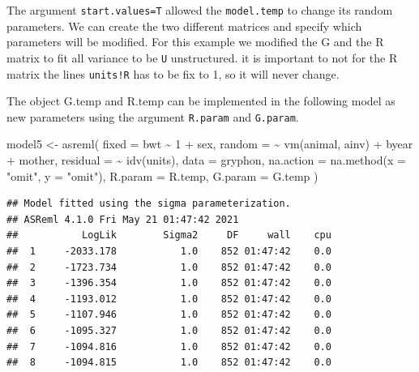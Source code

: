 \documentclass[
  12pt,
]{book}
\newenvironment{Shaded}{\begin{snugshade}}{\end{snugshade}}
\newcommand{\AttributeTok}[1]{\textcolor[rgb]{0.77,0.63,0.00}{#1}}
\newcommand{\DecValTok}[1]{\textcolor[rgb]{0.00,0.00,0.81}{#1}}
\newcommand{\FunctionTok}[1]{\textcolor[rgb]{0.00,0.00,0.00}{#1}}
\newcommand{\NormalTok}[1]{#1}
\newcommand{\OtherTok}[1]{\textcolor[rgb]{0.56,0.35,0.01}{#1}}
\newcommand{\SpecialCharTok}[1]{\textcolor[rgb]{0.00,0.00,0.00}{#1}}
\newcommand{\StringTok}[1]{\textcolor[rgb]{0.31,0.60,0.02}{#1}}
\begin{document}
The argument \texttt{start.values=T} allowed the \texttt{model.temp} to change its random parameters. We can create the two different matrices and specify which parameters will be modified. For this example we modified the G and the R matrix to fit all variance to be \texttt{U} unstructured. it is important to not for the R matrix the lines \texttt{units!R} has to be fix to 1, so it will never change.

The object G.temp and R.temp can be implemented in the following model as new parameters using the argument \texttt{R.param} and \texttt{G.param}.

\begin{Shaded}
\begin{Highlighting}[]
\NormalTok{model5 }\OtherTok{\textless{}{-}} \FunctionTok{asreml}\NormalTok{(}
  \AttributeTok{fixed =}\NormalTok{ bwt }\SpecialCharTok{\textasciitilde{}} \DecValTok{1} \SpecialCharTok{+}\NormalTok{ sex,}
  \AttributeTok{random =} \SpecialCharTok{\textasciitilde{}} \FunctionTok{vm}\NormalTok{(animal, ainv) }\SpecialCharTok{+}\NormalTok{ byear }\SpecialCharTok{+}\NormalTok{ mother,}
  \AttributeTok{residual =} \SpecialCharTok{\textasciitilde{}} \FunctionTok{idv}\NormalTok{(units),}
  \AttributeTok{data =}\NormalTok{ gryphon,}
  \AttributeTok{na.action =} \FunctionTok{na.method}\NormalTok{(}\AttributeTok{x =} \StringTok{"omit"}\NormalTok{, }\AttributeTok{y =} \StringTok{"omit"}\NormalTok{),}
  \AttributeTok{R.param =}\NormalTok{ R.temp, }\AttributeTok{G.param =}\NormalTok{ G.temp}
\NormalTok{)}
\end{Highlighting}
\end{Shaded}

\begin{verbatim}
## Model fitted using the sigma parameterization.
## ASReml 4.1.0 Fri May 21 01:47:42 2021
##           LogLik        Sigma2     DF     wall    cpu
##  1     -2033.178           1.0    852 01:47:42    0.0
##  2     -1723.734           1.0    852 01:47:42    0.0
##  3     -1396.354           1.0    852 01:47:42    0.0
##  4     -1193.012           1.0    852 01:47:42    0.0
##  5     -1107.946           1.0    852 01:47:42    0.0
##  6     -1095.327           1.0    852 01:47:42    0.0
##  7     -1094.816           1.0    852 01:47:42    0.0
##  8     -1094.815           1.0    852 01:47:42    0.0
\end{verbatim}

\begin{Shaded}
\end{Shaded}
\end{document}
